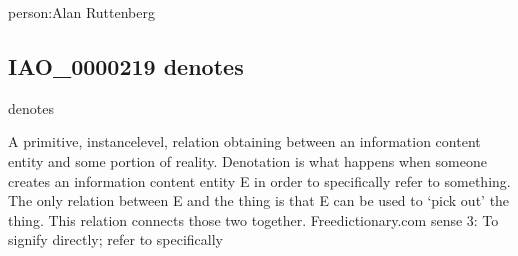 \documentclass[letterpaper,10pt,english]{sphinxmanual}
\begin{document}
\begin{sphinxShadowBox}

\sphinxAtStartPar
{}
\end{sphinxShadowBox}

\begin{sphinxShadowBox}

\sphinxAtStartPar
person:Alan Ruttenberg
\end{sphinxShadowBox}
\begin{quote}

\ignorespaces \end{quote}


\subsection{IAO\_0000219 \sphinxhyphen{} denotes}
\label{\detokenize{doc-IAO_0000219:iao-0000219-denotes}}\label{\detokenize{doc-IAO_0000219:index-0}}\label{\detokenize{doc-IAO_0000219::doc}}
\begin{sphinxShadowBox}

\sphinxAtStartPar
denotes
\end{sphinxShadowBox}

\begin{sphinxShadowBox}

\sphinxAtStartPar
{\hyperref[\detokenize{doc-IAO_0000136::doc}]{}}
\end{sphinxShadowBox}

\begin{sphinxShadowBox}

\sphinxAtStartPar
A primitive, instance\sphinxhyphen{}level, relation obtaining between an information content entity and some portion of reality. Denotation is what happens when someone creates an information content entity E in order to specifically refer to something. The only relation between E and the thing is that E can be used to ‘pick out’ the thing. This relation connects those two together. Freedictionary.com sense 3: To signify directly; refer to specifically
\end{sphinxShadowBox}
\end{document}
